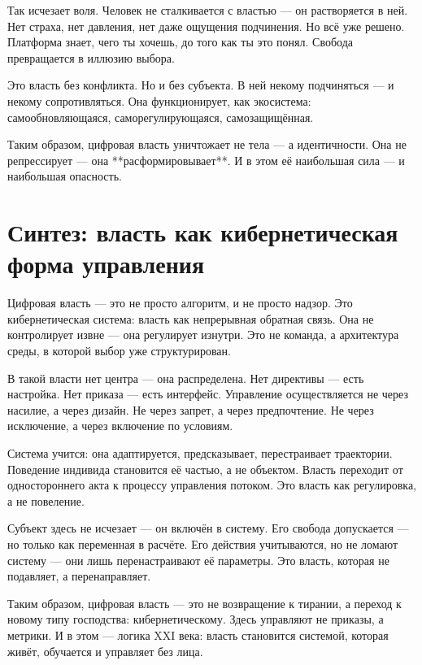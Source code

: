 Так исчезает воля. Человек не сталкивается с властью — он растворяется в ней. Нет страха, нет давления, нет даже ощущения подчинения. Но всё уже решено. Платформа знает, чего ты хочешь, до того как ты это понял. Свобода превращается в иллюзию выбора.

Это власть без конфликта. Но и без субъекта. В ней некому подчиняться — и некому сопротивляться. Она функционирует, как экосистема: самообновляющаяся, саморегулирующаяся, самозащищённая.

Таким образом, цифровая власть уничтожает не тела — а идентичности. Она не репрессирует — она **расформировывает**. И в этом её наибольшая сила — и наибольшая опасность.

\section{Синтез: власть как кибернетическая форма управления}

Цифровая власть — это не просто алгоритм, и не просто надзор. Это кибернетическая система: власть как непрерывная обратная связь. Она не контролирует извне — она регулирует изнутри. Это не команда, а архитектура среды, в которой выбор уже структурирован.

В такой власти нет центра — она распределена. Нет директивы — есть настройка. Нет приказа — есть интерфейс. Управление осуществляется не через насилие, а через дизайн. Не через запрет, а через предпочтение. Не через исключение, а через включение по условиям.

Система учится: она адаптируется, предсказывает, перестраивает траектории. Поведение индивида становится её частью, а не объектом. Власть переходит от одностороннего акта к процессу управления потоком. Это власть как регулировка, а не повеление.

Субъект здесь не исчезает — он включён в систему. Его свобода допускается — но только как переменная в расчёте. Его действия учитываются, но не ломают систему — они лишь перенастраивают её параметры. Это власть, которая не подавляет, а перенаправляет.

Таким образом, цифровая власть — это не возвращение к тирании, а переход к новому типу господства: кибернетическому. Здесь управляют не приказы, а метрики. И в этом — логика XXI века: власть становится системой, которая живёт, обучается и управляет без лица.

